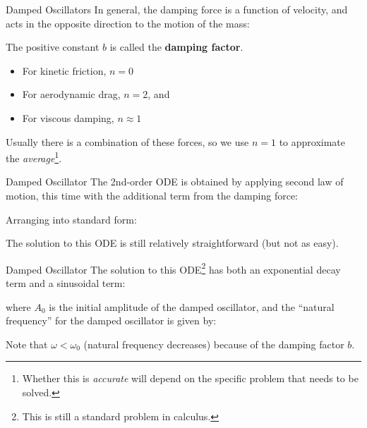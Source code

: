 \documentclass[12pt,compress,aspectratio=169]{beamer}
\begin{document}
\begin{frame}{Damped Oscillators}
  In general, the damping force is a function of velocity, and acts in the
  opposite direction to the motion of the mass:
  

  \vspace{-.15in}The positive constant $b$ is called the \textbf{damping
    factor}.
  \begin{itemize}
  \item For kinetic friction, $n=0$
  \item For aerodynamic drag, $n=2$, and
  \item For viscous damping, $n\approx 1$
  \end{itemize}
  Usually there is a combination of these forces, so we use $n=1$ to
  approximate the \emph{average}\footnote{Whether this is
  \emph{accurate} will depend on the specific problem that needs to be solved.}.
\end{frame}




\begin{frame}{Damped Oscillator}
  The 2nd-order ODE is obtained by applying second law of motion, this time
  with the additional term from the damping force:


  Arranging into standard form:
  

  The solution to this ODE is still relatively straightforward (but not as
  easy).
\end{frame}



\begin{frame}{Damped Oscillator}
  The solution to this ODE\footnote{This is still a standard problem in
    calculus.} has both an {\color{magenta}exponential decay term} and a
  {\color{cyan}sinusoidal term}:


  where $A_0$ is the initial amplitude of the damped oscillator,
  and the ``natural frequency'' for the damped oscillator is given by:

  
  Note that $\omega<\omega_0$ (natural frequency decreases) because of the
  damping factor $b$.
  \vspace{.3in}
\end{frame}
\end{document}
